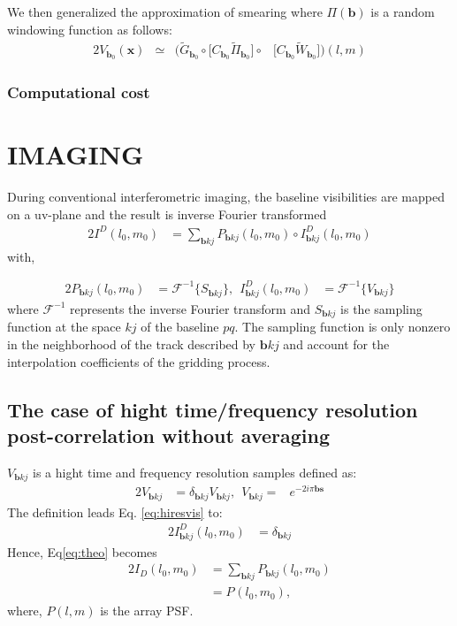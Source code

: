 We then generalized the approximation of smearing where $\Pi(\mathbf{b})$ is a random windowing function 
as follows:
\begin{alignat}{2}
V_{\mathbf{b}_0}(\mathbf{x}) &\simeq &\Bigg(\widetilde{G}_{\mathbf{b}_0}\circ\Big[C_{\mathbf{b}_0}\widetilde{\Pi}_{\mathbf{b}_0}\Big]
		    \circ &\Big[C_{\mathbf{b}_0}\widetilde{W}_{\mathbf{b}_0}\Big]\Bigg)(l,m)\label{eq:xx}		    
\end{alignat}
\subsubsection{Computational cost} 
\section{IMAGING} 
During conventional interferometric imaging,
the baseline visibilities are mapped on a uv-plane and the result is inverse Fourier transformed
\begin{alignat}{2}
I^{D}(l_0,m_0)  %
	  &=\sum_{\mathbf{b} kj}P_{\mathbf{b}kj}(l_0,m_0)\circ I^{D}_{\mathbf{b} kj}(l_0,m_0)\label{eq:theo}%
\end{alignat}
with,

\begin{alignat}{2}
P_{\mathbf{b}kj}(l_0,m_0)&=\mathcal{F}^{-1}\{S^{}_{\mathbf{b}kj}\}, ~~
I^{D}_{\mathbf{b}kj}(l_0,m_0)&=\mathcal{F}^{-1}\{V_{\mathbf{b}kj}\} \label{eq:hiresvis}
\end{alignat}
where $\mathcal{F}^{-1}$ represents the inverse Fourier transform and $S^{}_{\mathbf{b}kj}$ is the 
sampling function at the space $kj$ of the baseline $pq$. The sampling function is only nonzero 
in the neighborhood of the track described by $\mathbf{b}kj $ and account for the interpolation coefficients 
of the gridding process. 
\subsection{The case of hight time/frequency resolution post-correlation without averaging}
$V_{\mathbf{b}kj}$ is a hight time and frequency resolution samples defined as: 
\begin{alignat}{2}
V_{\mathbf{b}kj}&=\delta_{\mathbf{b}kj}V_{\mathbf{b}kj}, ~~
V_{\mathbf{b}kj} =&e^{-2i\pi\mathbf{b}\mathbf{s}} 
\end{alignat}
The definition leads Eq. \ref{eq:hiresvis} to:
\begin{alignat}{2}
I^{D}_{\mathbf{b}kj}(l_0,m_0)&= \delta_{\mathbf{b}kj}
\end{alignat}
Hence, Eq\ref{eq:theo} becomes
\begin{alignat}{2}
I_{D}(l_0,m_0)&=\sum_{\mathbf{b} kj}P_{\mathbf{b}kj}(l_0,m_0)\\
	      &=P_{}(l_0,m_0),
\end{alignat}
where, $P(l,m)$ is the array PSF.
